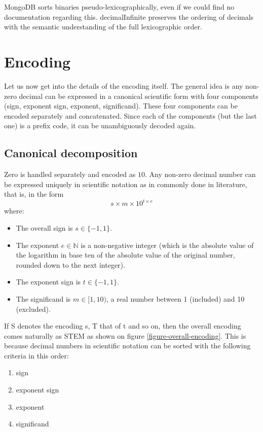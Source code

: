 \documentclass{acm_proc_article-sp}
\begin{document}
MongoDB sorts binaries pseudo-lexicographically, even if we could find no documentation regarding this. decimalInfinite preserves the ordering of decimals with the semantic understanding of the full lexicographic order.

\section{Encoding}
\label{section-encoding}
Let us now get into the details of the encoding itself. The general idea is any non-zero decimal can be expressed in a canonical scientific form with four components (sign, exponent sign, exponent, significand). These four components can be encoded separately and concatenated. Since each of the components (but the last one) is a prefix code, it can be unambiguously decoded again.

\subsection{Canonical decomposition}

Zero is handled separately and encoded as $10$. Any non-zero decimal number can be expressed uniquely in scientific notation as in commonly done in literature, that is, in the form $$s\times m \times10^{t\times e}$$ where:

\begin{itemize}
\item The overall sign is $s\in \{-1, 1\}$.
\item The exponent $e\in \mathbb{N}$ is a non-negative integer (which is the absolute value of the logarithm in base ten of the absolute value of the original number, rounded down to the next integer).
\item The exponent sign is $t\in \{-1, 1\}$.
\item The significand is $m\in [1,10)$, a real number between 1 (included) and 10 (excluded).
\end{itemize}

If S denotes the encoding s, T that of t and so on, then the overall encoding comes naturally as STEM as shown on figure \ref{figure-overall-encoding}. This is because decimal numbers in scientific notation can be sorted with the following criteria in this order:
\begin{enumerate}
\item sign
\item exponent sign
\item exponent
\item significand
\end{enumerate}
\end{document}
